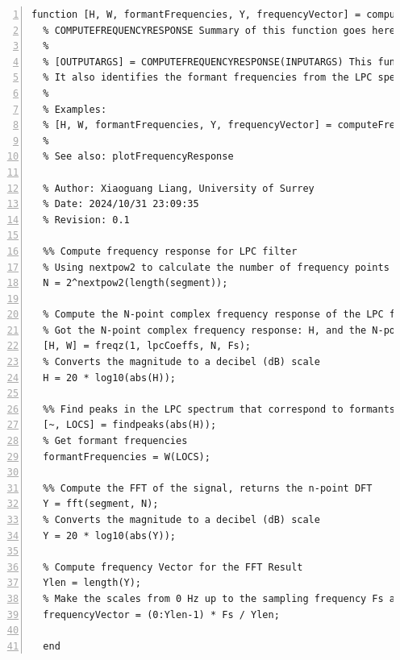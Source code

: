 \documentclass{article}
\begin{document}
\begin{lstlisting}[frame=single, numbers=left, style=Matlab-editor, caption={computeFrequencyResponse.m}, label={lst:computeFrequencyResponse}]
  function [H, W, formantFrequencies, Y, frequencyVector] = computeFrequencyResponse(lpcCoeffs, segment, Fs)
  % COMPUTEFREQUENCYRESPONSE Summary of this function goes here
  %
  % [OUTPUTARGS] = COMPUTEFREQUENCYRESPONSE(INPUTARGS) This function computes the frequency response of an LPC filter and the FFT of a given segment.
  % It also identifies the formant frequencies from the LPC spectrum.
  %
  % Examples:
  % [H, W, formantFrequencies, Y, frequencyVector] = computeFrequencyResponse(lpcCoeffs, segment, 16000);
  %
  % See also: plotFrequencyResponse
  
  % Author: Xiaoguang Liang, University of Surrey
  % Date: 2024/10/31 23:09:35
  % Revision: 0.1
  
  %% Compute frequency response for LPC filter
  % Using nextpow2 to calculate the number of frequency points
  N = 2^nextpow2(length(segment));
  
  % Compute the N-point complex frequency response of the LPC filter
  % Got the N-point complex frequency response: H, and the N-point frequency vector: W
  [H, W] = freqz(1, lpcCoeffs, N, Fs);
  % Converts the magnitude to a decibel (dB) scale
  H = 20 * log10(abs(H));
  
  %% Find peaks in the LPC spectrum that correspond to formants
  [~, LOCS] = findpeaks(abs(H));
  % Get formant frequencies
  formantFrequencies = W(LOCS);
  
  %% Compute the FFT of the signal, returns the n-point DFT
  Y = fft(segment, N);
  % Converts the magnitude to a decibel (dB) scale
  Y = 20 * log10(abs(Y));
  
  % Compute frequency Vector for the FFT Result
  Ylen = length(Y);
  % Make the scales from 0 Hz up to the sampling frequency Fs and provides the frequency for each point in Y.
  frequencyVector = (0:Ylen-1) * Fs / Ylen;
  
  end

\end{lstlisting}
\end{document}
